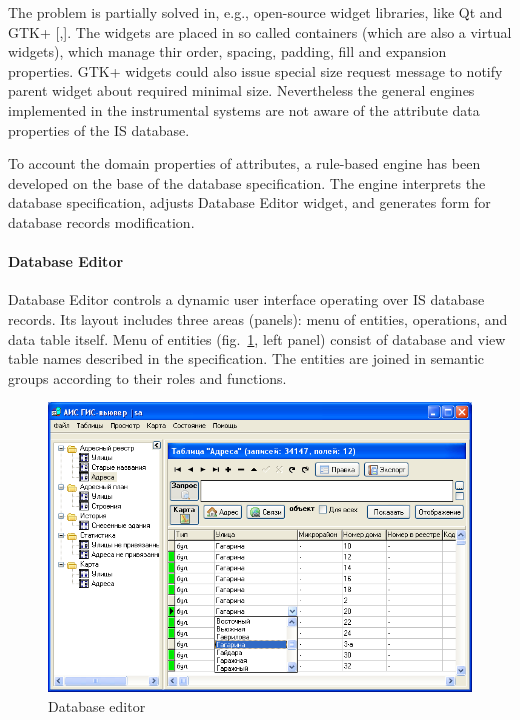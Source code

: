 \documentclass[conference]{IEEEtran}
\begin{document}
The problem is partially solved in, e.g., open-source widget libraries, like Qt and GTK+ [,].  The widgets are placed in so called containers (which are also a virtual widgets), which manage thir order, spacing, padding, fill and expansion properties.  GTK+ widgets could also issue special size request message to notify parent widget about required minimal size.  Nevertheless the general engines implemented in the instrumental systems are not aware of the attribute data properties of the IS database.

To account the domain properties of attributes, a rule-based engine has been developed on the base of the database specification.  The engine interprets the database specification, adjusts Database Editor widget, and generates form for database records modification.

\paragraph{Database Editor}

Database Editor controls a dynamic user interface operating over IS database records.  Its layout includes three areas (panels): menu of entities, operations, and data table itself.  Menu of entities (fig.~\ref{fig:dbeditor}, left panel) consist of database and view table names described in the specification.  The entities are joined in semantic groups according to their roles and functions.

\begin{figure}[tb]
  \centering
  \includegraphics[width=\linewidth]{dbeditor.png}
  \caption{Database editor}
  \label{fig:dbeditor}
\end{figure}
\end{document}
